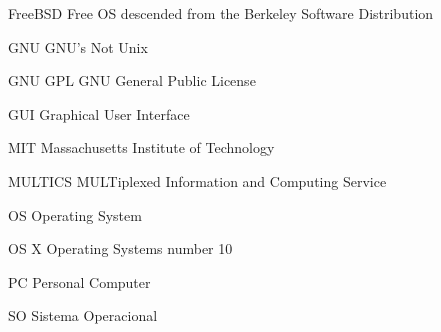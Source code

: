\begin{siglas}
    \item[FreeBSD] Free OS descended from the Berkeley Software Distribution 
    \item[GNU] GNU's Not Unix
    \item[GNU GPL] GNU General Public License
    \item[GUI] Graphical User Interface
    \item[MIT] Massachusetts Institute of Technology
    \item[MULTICS] MULTiplexed Information and Computing Service 
    \item[OS] Operating System  
    \item[OS X] Operating Systems number 10 
    \item[PC] Personal Computer
    \item[SO] Sistema Operacional
\end{siglas}